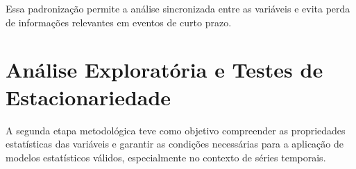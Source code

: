\documentclass[	12pt, Times, openright, oneside, a4paper, english, brazil]{abntex2}
\begin{document}
\begin{table}[!ht]
    \centering
    \small
    \caption{Estatísticas descritivas das séries brutas antes das transformações de estacionariedade. Selic: valor diário da taxa anual; câmbio: R\$/US\$ (dólar comercial); IPCA: variação mensal (\%); PIB: R\$ milhões correntes (trimestral, interpolado); Ibovespa: pontos; EMBI+: pontos-base; expectativa IPCA: \% ao mês (Fonte: Autor).}\label{tabela:estatisticas_descritivas}
\end{table}

Essa padronização permite a análise sincronizada entre as variáveis e evita perda de informações relevantes em eventos de curto prazo.

\section{Análise Exploratória e Testes de Estacionariedade}

A segunda etapa metodológica teve como objetivo compreender as propriedades estatísticas das variáveis e garantir as condições necessárias para a aplicação de modelos estatísticos válidos, especialmente no contexto de séries temporais.
\end{document}
